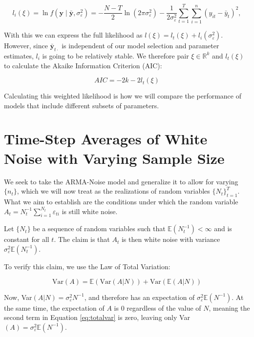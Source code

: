 \documentclass{TUT}
\numberwithin{equation}{section}
\theoremstyle{plain}
\begin{document}
\begin{equation}
l_i(\xi) = \ln f(\mathbf{y} \mid \bar{\mathbf{y}}, \sigma_\varepsilon^2)
= -\frac{N-T}{2} \ln(2 \pi \sigma_\varepsilon^2)
- \frac{1}{2 \sigma_\varepsilon^2} \sum_{t=1}^{T} \sum_{i=1}^{n} 
\left( y_{it} - \bar{y}_t \right)^2,
\end{equation}


With this we can express the full likelihood as $l(\xi) = l_t(\xi) + l_i(\sigma_\varepsilon^2)$. However, since $\bar{\mathbf{y}}_{t\cdot}$ is independent of our model selection and parameter estimates, $l_i$ is going to be relatively stable. We therefore pair $\xi \in \mathbb{R}^k$ and $l_t(\xi)$ to calculate the Akaike Information Criterion (AIC): 

$$ AIC = -2k -2l_t(\xi) $$

Calculating this weighted likelihood is how we will compare the performance of models that include different subsets of parameters.





% 

\section{Time-Step Averages of White Noise with Varying Sample Size}

We seek to take the ARMA-Noise model and generalize it to allow for varying $\{n_t\}$, which we will now treat as the realizations of random variables $\{N_t\}_{t=1}^T$. What we aim to establish are the conditions under which the random variable $A_t = N_t^{-1}\sum_{i=1}^{N_t}\varepsilon_{ti}$ is still white noise.

Let $\{N_t\}$ be a sequence of random variables such that $\mathbb{E}(N_t^{-1})<\infty$ and is constant for all $t$. The claim is that $A_t$ is then white noise with variance $\sigma_\varepsilon^2\mathbb{E}(N_t^{-1})$. 

To verify this claim, we use the Law of Total Variation:

\begin{equation}
    \label{eq:totalvar}
    \text{Var}(A) = \mathbb{E}(\text{Var}(A|N)) + \text{Var}(\mathbb{E}(A|N))
\end{equation}

Now, Var$(A|N) = \sigma_\varepsilon^2N^{-1}$, and therefore has an expectation of $\sigma_\varepsilon^2\mathbb{E}(N^{-1})$. At the same time, the expectation of $A$ is $0$ regardless of the value of $N$, meaning the second term in Equation \ref{eq:totalvar} is zero, leaving only Var$(A) = \sigma_\varepsilon^2\mathbb{E}(N^{-1})$.
\end{document}
